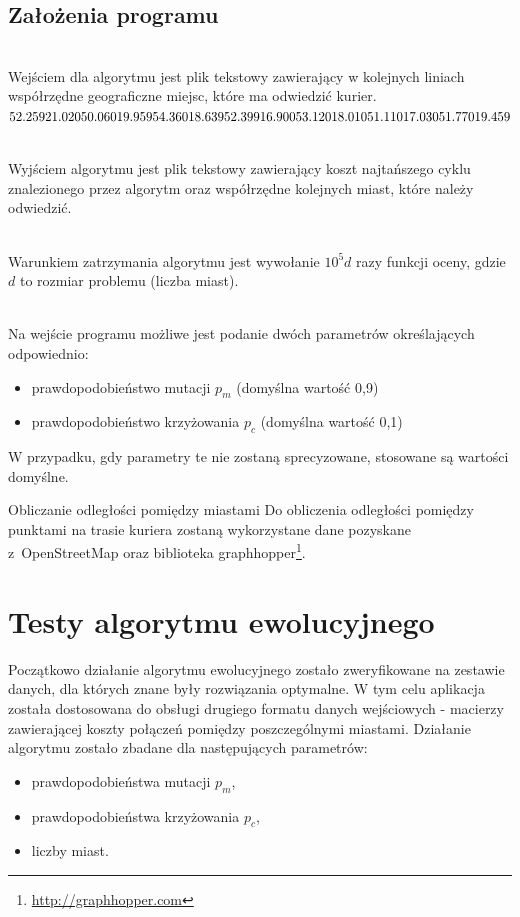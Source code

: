 \documentclass[12pt, a4paper]{article}
\begin{document}
\subsection{Założenia programu}
\begin{description}
	\item[Wejście] \hfill \\
Wejściem dla algorytmu jest plik tekstowy zawierający w kolejnych liniach współrzędne geograficzne miejsc, które ma odwiedzić kurier. 
$
52.259 21.020 \\ 
50.060 19.959 \\
54.360 18.639 \\
52.399 16.900 \\
53.120 18.010 \\
51.110 17.030 \\
51.770 19.459 \\
$
	\item[Wyjście] \hfill \\
	Wyjściem algorytmu jest plik tekstowy zawierający koszt najtańszego cyklu znalezionego przez algorytm oraz współrzędne kolejnych miast, które należy odwiedzić.
	\item[Kryteria stopu] \hfill \\
	Warunkiem zatrzymania algorytmu jest wywołanie $10^5d$ razy funkcji oceny, gdzie $d$ to rozmiar problemu (liczba miast).
	\item[Parametry] \hfill \\
	Na wejście programu możliwe jest podanie dwóch parametrów określających odpowiednio:
		\begin{itemize}
			\item prawdopodobieństwo mutacji $p_m$ (domyślna wartość 0,9)
			\item prawdopodobieństwo krzyżowania $p_c$ (domyślna wartość 0,1)
		\end{itemize}
		W przypadku, gdy parametry te nie zostaną sprecyzowane, stosowane są wartości domyślne.
		\item Obliczanie odległości pomiędzy miastami
		Do obliczenia odległości pomiędzy punktami na trasie kuriera zostaną wykorzystane dane pozyskane z~OpenStreetMap oraz biblioteka graphhopper\footnote{\url{http://graphhopper.com}}.

\end{description}

\section{Testy algorytmu ewolucyjnego}
Początkowo działanie algorytmu ewolucyjnego zostało zweryfikowane na zestawie danych, dla których znane były rozwiązania optymalne. W tym celu aplikacja została dostosowana do obsługi drugiego formatu danych wejściowych - macierzy zawierającej koszty połączeń pomiędzy poszczególnymi miastami.
Działanie algorytmu zostało zbadane dla następujących parametrów:
\begin{itemize}
	\item prawdopodobieństwa mutacji $p_m$,
	\item prawdopodobieństwa krzyżowania $p_c$,
	\item liczby miast.
\end{itemize}
\end{document}
